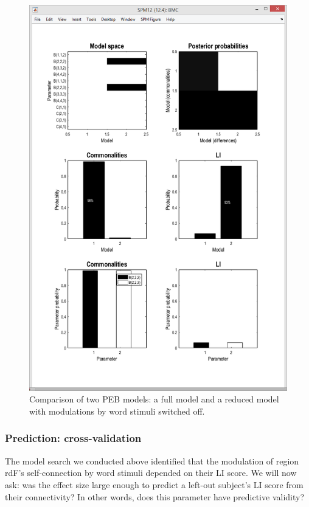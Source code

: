 \documentclass{article}
\begin{document}
\begin{figure}[ht]
\begin{center}
\includegraphics{"Fig_peb_2model_bmc"}
\caption{Comparison of two PEB models: a full model and a reduced model with modulations by word stimuli switched off.\label{Fig_peb_2model_bmc}}
\end{center}
\end{figure}

\subsubsection{Prediction: cross-validation} \label{GUI_LOO}

The model search we conducted above identified that the modulation of region rdF's self-connection by word stimuli depended on their LI score. We will now ask: was the effect size large enough to predict a left-out subject's LI score from their connectivity? In other words, does this parameter have predictive validity?
\end{document}
